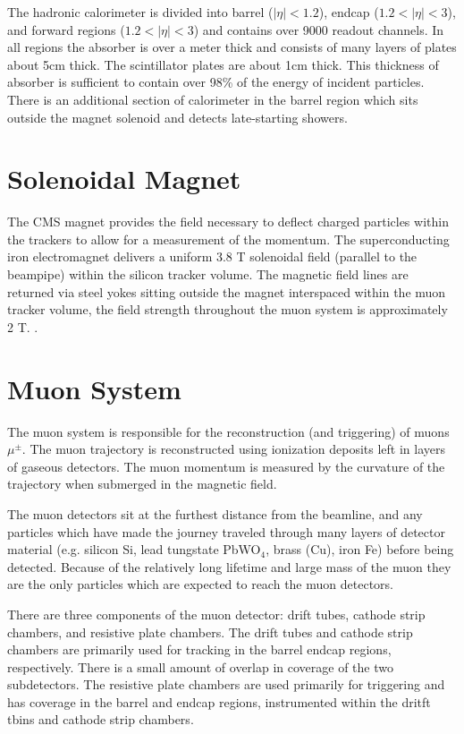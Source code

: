 The hadronic calorimeter is divided into barrel ($|\eta|<1.2$), endcap ($1.2<|\eta|<3$), and forward regions ($1.2<|\eta|<3$) and contains over 9000 readout channels. In all regions the absorber is over a meter thick and consists of many layers of plates about 5cm thick. The scintillator plates are about 1cm thick. This thickness of absorber is sufficient to contain over 98\% of the energy of incident particles. There is an additional section of calorimeter in the barrel region which sits outside the magnet solenoid and detects late-starting showers.

\section{Solenoidal Magnet}

The CMS magnet provides the field necessary to deflect charged particles within the trackers to allow for a measurement of the momentum. The superconducting iron electromagnet delivers a uniform 3.8 T solenoidal field (parallel to the beampipe) within the silicon tracker volume. The magnetic field lines are returned via steel yokes sitting outside the magnet interspaced within the muon tracker volume, the field strength throughout the muon system is approximately 2 T. \cite{magnettdr}.

\section{Muon System}

The muon system is responsible for the reconstruction (and triggering) of muons $\mu^{\pm}$. The muon trajectory is reconstructed using ionization deposits left in layers of gaseous detectors. The muon momentum is measured by the curvature of the trajectory when submerged in the magnetic field.\cite{muontdr}

The muon detectors sit at the furthest distance from the beamline, and any particles which have made the journey traveled through many layers of detector material (e.g. silicon Si, lead tungstate PbWO$_{4}$, brass (Cu), iron Fe) before being detected. Because of the relatively long lifetime and large mass of the muon they are the only particles which are expected to reach the muon detectors.

There are three components of the muon detector: drift tubes, cathode strip chambers, and resistive plate chambers. The drift tubes and cathode strip chambers are primarily used for tracking in the barrel endcap regions, respectively. There is a small amount of overlap in coverage of the two subdetectors. The resistive plate chambers are used primarily for triggering and has coverage in the barrel and endcap regions, instrumented within the dritft tbins and cathode strip chambers.

